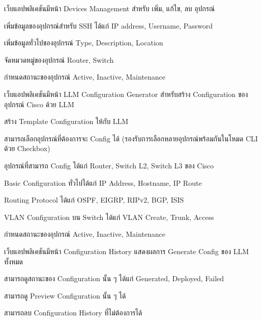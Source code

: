 \begin{mycustomenum2}
    \item เว็บแอปพลิเคชันมีหน้า Devices Management สำหรับ เพิ่ม, แก้ไข, ลบ อุปกรณ์
    \begin{mycustomenum2}
        \item เพิ่มข้อมูลของอุปกรณ์สำหรับ SSH ได้แก่ IP address, Username, Password
        \item เพิ่มข้อมูลทั่วไปของอุปกรณ์ Type, Description, Location 
        \item จัดหมวดหมู่ของอุปกรณ์ Router, Switch 
        \item กำหนดสถานะของอุปกรณ์ Active, Inactive, Maintenance
    \end{mycustomenum2}

    \item เว็บแอปพลิเคชันมีหน้า LLM Configuration Generator สำหรับสร้าง Configuration ของอุปกรณ์ Cisco ด้วย LLM 
    \begin{mycustomenum2}
        \item สร้าง Template Configuration ให้กับ LLM
        \item สามารถเลือกอุปกรณ์ที่ต้องการจะ Config ได้ (รองรับการเลือกหลายอุปกรณ์พร้อมกันในโหมด CLI ด้วย Checkbox)
        \vspace{4em}
        \item อุปกรณ์ที่สามารถ Config ได้แก่ Router, Switch L2, Switch L3 ของ Cisco 
            \begin{mycustomenum2}
                \item Basic Configuration ทั่วไปได้แก่ IP Address, Hostname, IP Route 
                \item Routing Protocol ได้แก่ OSPF, EIGRP, RIPv2, BGP, ISIS 
                \item VLAN Configuration บน Switch ได้แก่ VLAN Create, Trunk, Access 
            \end{mycustomenum2} 
        \item กำหนดสถานะของอุปกรณ์ Active, Inactive, Maintenance
    \end{mycustomenum2}

    \item เว็บแอปพลิเคชันมีหน้า Configuration History แสดงผลการ Generate Config ของ LLM ทั้งหมด 
    \begin{mycustomenum2}
        \item สามารถดูสถานะของ Configuration นั้น ๆ ได้แก่ Generated, Deployed, Failed
        \item สามารถดู Preview Configuration นั้น ๆ ได้ 
        \item สามารถลบ Configuration History ที่ไม่ต้องการได้
    \end{mycustomenum2}


\end{mycustomenum2}
